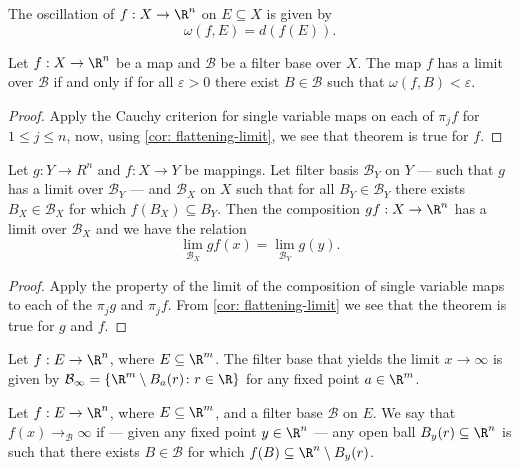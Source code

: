 \begin{definition}[Oscillation]
The oscillation of \(f: X \to \R^n\) on \(E \subseteq X\) is given by
\[
\omega(f, E) = d(f(E)).
\]
\end{definition}

\begin{theorem}
\label{thm: cauchy-criterion several}
Let \(f: X \to \R^n\) be a map and \(\mathcal B\) be a filter base over \(X\).
The map \(f\) has a limit over \(\mathcal B\) if and only if for all
\(\varepsilon > 0\) there exist \(B \in \mathcal B\) such that \(\omega(f, B)
< \varepsilon\).
\end{theorem}

\begin{proof}
Apply the Cauchy criterion for single variable maps on each of \(\pi_j  f\) for
\(1 \leq j \leq n\), now, using \cref{cor: flattening-limit}, we see that theorem
is true for \(f\).
\end{proof}

\begin{theorem}
Let \(g: Y \to R^n\) and \(f: X \to Y\) be mappings. Let filter basis
\(\mathcal B_Y\) on \(Y\) --- such that \(g\) has a limit over \(\mathcal
B_Y\) --- and \(\mathcal B_X\) on \(X\) such that for all \(B_Y \in \mathcal
B_Y\) there exists \(B_X \in \mathcal B_X\) for which \(f(B_X) \subseteq
B_Y\). Then the composition \(g  f: X \to \R^n\) has a limit over
\(\mathcal B_X\) and we have the relation
\[
\lim_{\mathcal B_X} g  f (x) = \lim_{\mathcal B_Y} g(y).
\]
\end{theorem}

\begin{proof}
Apply the property of the limit of the composition of single variable maps to
each of the \(\pi_j  g\) and \(\pi_j  f\). From \cref{cor: flattening-limit} we
see that the theorem is true for \(g\) and \(f\).
\end{proof}

\begin{definition}
Let \(f: E \to \R^n\), where \(E \subseteq \R^m\). The filter base that yields
the limit \(x \to \infty\) is given by \(\mathcal B_\infty = \{\R^m \setminus
B_a(r) \colon r \in \R\}\) for any fixed point \(a \in \R^m\).
\end{definition}

\begin{definition}
Let \(f: E \to \R^n\), where \(E \subseteq \R^m\), and a filter base
\(\mathcal B\) on \(E\). We say that \(f(x) \to_\mathcal{B} \infty\) if ---
given any fixed point \(y \in \R^n\) --- any open ball \(B_y(r) \subseteq
\R^n\) is such that there exists \(B \in \mathcal B\) for which \(f(B)
\subseteq \R^n \setminus B_y(r)\).
\end{definition}

